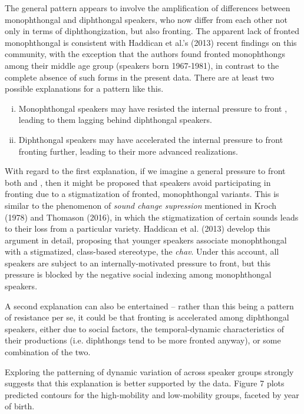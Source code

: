 \documentclass[12pt]{article}
\begin{document}
The general pattern appears to involve the amplification of differences between monophthongal and diphthongal speakers, who now differ from each other not only in terms of diphthongization, but also fronting. The apparent lack of fronted monophthongal  is consistent with Haddican et al.'s (2013) recent findings on this community, with the exception that the authors found fronted monophthongs among their middle age group (speakers born 1967-1981), in contrast to the complete absence of such forms in the present data. There are at least two possible explanations for a pattern like this. \begin{enumerate}[(i)]\item{Monophthongal speakers may have resisted the internal pressure to front , leading to them lagging behind diphthongal speakers.}
\item{Diphthongal speakers may have accelerated the internal pressure to front  fronting further, leading to their more advanced realizations.}
\end{enumerate}

With regard to the first explanation, if we imagine a general pressure to front both  and , then it might be proposed that speakers avoid participating in  fronting due to a stigmatization of fronted, monophthongal variants. This is similar to the phenomenon of \textit{sound change supression} mentioned in Kroch (1978) and Thomason (2016), in which the stigmatization of certain sounds leads to their loss from a particular variety. Haddican et al. (2013) develop this argument in detail, proposing that younger speakers associate monophthongal  with a stigmatized, class-based stereotype, the \textit{chav}. Under this account, all speakers are subject to an internally-motivated pressure to front, but this pressure is blocked by the negative social indexing among monophthongal speakers.

A second explanation can also be entertained -- rather than this being a pattern of resistance per se, it could be that fronting is accelerated among diphthongal speakers, either due to social factors, the temporal-dynamic characteristics of their  productions (i.e. diphthongs tend to be more fronted anyway), or some combination of the two.

 Exploring the patterning of dynamic variation of  across speaker groups strongly suggests that this explanation is better supported by the data. Figure 7 plots predicted contours for the high-mobility and low-mobility groups, faceted by year of birth.
\end{document}
